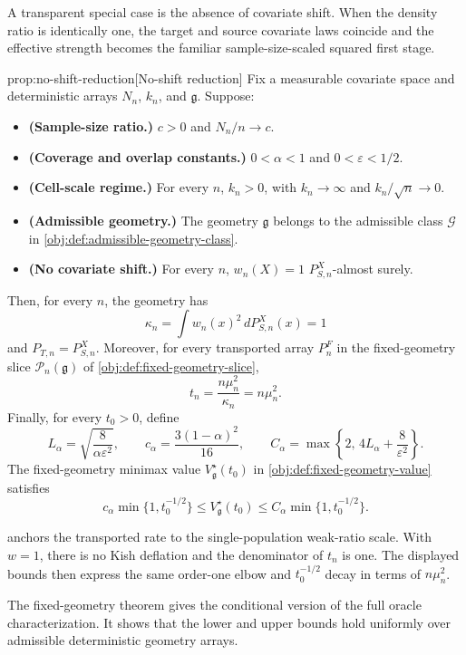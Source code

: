 \documentclass[11pt]{article}
\begin{document}
A transparent special case is the absence of covariate shift. When the density ratio is identically one, the target and source covariate laws coincide and the effective strength becomes the familiar sample-size-scaled squared first stage.

\begin{theoremv}{prop:no-shift-reduction}[No-shift reduction]
Fix a measurable covariate space and deterministic arrays \(N_n\), \(k_n\), and \(\mathfrak g\). Suppose:
\begin{itemize}
\item \textbf{(Sample-size ratio.)} \(c>0\) and \(N_n/n\to c\).
\item \textbf{(Coverage and overlap constants.)} \(0<\alpha<1\) and \(0<\varepsilon<1/2\).
\item \textbf{(Cell-scale regime.)} For every \(n\), \(k_n>0\), with \(k_n\to\infty\) and \(k_n/\sqrt n\to0\).
\item \textbf{(Admissible geometry.)} The geometry \(\mathfrak g\) belongs to the admissible class \(\mathcal G\) in \cref{obj:def:admissible-geometry-class}.
\item \textbf{(No covariate shift.)} For every \(n\), \(w_n(X)=1\) \(P_{S,n}^X\)-almost surely.
\end{itemize}
Then, for every \(n\), the geometry has
\[
\kappa_n=\int w_n(x)^2\,dP_{S,n}^X(x)=1
\]
and \(P_{T,n}=P_{S,n}^X\). Moreover, for every transported array \(P_n^F\) in the fixed-geometry slice \(\mathcal P_n(\mathfrak g)\) of \cref{obj:def:fixed-geometry-slice},
\[
t_n=\frac{n\mu_n^2}{\kappa_n}=n\mu_n^2 .
\]
Finally, for every \(t_0>0\), define
\[
L_\alpha=\sqrt{\frac{8}{\alpha\varepsilon^2}},
\qquad
c_\alpha=\frac{3(1-\alpha)^2}{16},
\qquad
C_\alpha=\max\left\{2,\,4L_\alpha+\frac{8}{\varepsilon^2}\right\}.
\]
The fixed-geometry minimax value \(V_{\mathfrak g}^\star(t_0)\) in \cref{obj:def:fixed-geometry-value} satisfies
\[
c_\alpha\min\{1,t_0^{-1/2}\}
\le
V_{\mathfrak g}^\star(t_0)
\le
C_\alpha\min\{1,t_0^{-1/2}\}.
\]
\end{theoremv}

 anchors the transported rate to the single-population weak-ratio scale. With \(w=1\), there is no Kish deflation and the denominator of \(t_n\) is one. The displayed bounds then express the same order-one elbow and \(t_0^{-1/2}\) decay in terms of \(n\mu_n^2\).

The fixed-geometry theorem gives the conditional version of the full oracle characterization. It shows that the lower and upper bounds hold uniformly over admissible deterministic geometry arrays.
\end{document}
